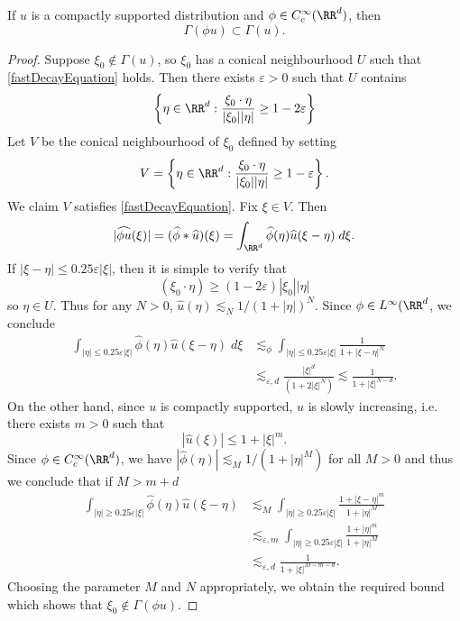 \begin{lemma} \label{wavefrontlocalizationlemma}
  If $u$ is a compactly supported distribution and $\phi \in C_c^\infty(\RR^d)$, then
  \[ \Gamma(\phi u) \subset \Gamma(u). \]
\end{lemma}
\begin{proof}
  Suppose $\xi_0 \not \in \Gamma(u)$, so $\xi_0$ has a conical neighbourhood $U$ such that \eqref{fastDecayEquation} holds. Then there exists $\varepsilon > 0$ such that $U$ contains
  \[ \left\{ \eta \in \RR^d : \frac{\xi_0 \cdot \eta}{|\xi_0| |\eta|} \geq 1 - 2\varepsilon \right\} \]
  Let $V$ be the conical neighbourhood of $\xi_0$ defined by setting
  \[ V = \left\{ \eta \in \RR^d : \frac{\xi_0 \cdot \eta}{|\xi_0| |\eta|} \geq 1 - \varepsilon \right\}. \]
  We claim $V$ satisfies \eqref{fastDecayEquation}. Fix $\xi \in V$. Then
  \[ |\widehat{\phi u}(\xi)| = (\widehat{\phi} * \widehat{u})(\xi) = \int_{\RR^d} \widehat{\phi}(\eta) \widehat{u}(\xi - \eta)\; d\xi. \]
  If $|\xi - \eta| \leq 0.25 \varepsilon |\xi|$, then it is simple to verify that
  \[ (\xi_0 \cdot \eta) \geq (1 - 2\varepsilon) |\xi_0| |\eta| \]
  so $\eta \in U$. Thus for any $N > 0$, $\widehat{u}(\eta) \lesssim_N 1/(1 + |\eta|)^N$. Since $\phi \in L^\infty(\RR^d$, we conclude
  \begin{align*}
    \int_{|\eta| \leq 0.25 \varepsilon |\xi|} \widehat{\phi}(\eta) \widehat{u}(\xi - \eta)\; d\xi &\lesssim_{\phi} \int_{|\eta| \leq 0.25 \varepsilon |\xi|} \frac{1}{1 + |\xi - \eta|^N}\\
    &\lesssim_{\varepsilon,d} \frac{|\xi|^d}{(1 + 2 |\xi|^{N})} \lesssim \frac{1}{1 + |\xi|^{N-d}}.
  \end{align*}
  On the other hand, since $u$ is compactly supported, $\widehat{u}$ is slowly increasing, i.e. there exists $m > 0$ such that
  \[ |\widehat{u}(\xi)| \leq 1 + |\xi|^m. \]
  Since $\phi \in C_c^\infty(\RR^d)$, we have $|\widehat{\phi}(\eta)| \lesssim_M 1/(1 + |\eta|^M)$ for all $M > 0$ and thus we conclude that if $M > m + d$
  \begin{align*}
    \int_{|\eta| \geq 0.25 \varepsilon |\xi|} \widehat{\phi}(\eta) \widehat{u}(\xi - \eta) &\lesssim_M \int_{|\eta| \geq 0.25 \varepsilon |\xi|} \frac{1 + |\xi - \eta|^m}{1 + |\eta|^M}\\
    &\lesssim_{\varepsilon,m} \int_{|\eta| \geq 0.25 \varepsilon |\xi|} \frac{1 + |\eta|^m}{1 + |\eta|^M}\\
    &\lesssim_{\varepsilon,d} \frac{1}{1 + |\xi|^{M-m-d}}.
  \end{align*}
  Choosing the parameter $M$ and $N$ appropriately, we obtain the required bound which shows that $\xi_0 \not \in \Gamma(\phi u)$.
\end{proof}

